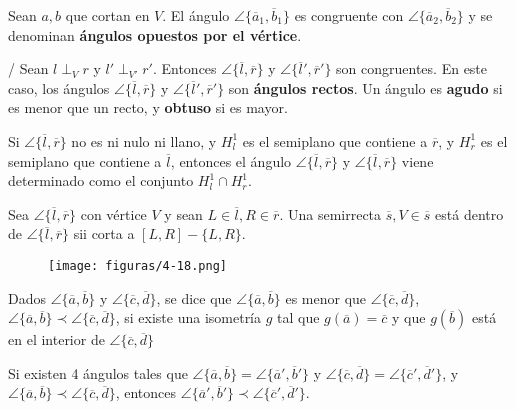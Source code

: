  Sean $a,b$ que cortan en $V$. El ángulo  $\angle \{\overline{a}_1, \overline{b}_1 \}$ es congruente con  $\angle \{\overline{a}_2, \overline{b}_2 \}$ y se denominan \textbf{ángulos opuestos por el vértice}.

/ Sean $l\perp_V r$ y $l'\perp_{V'}r'$. Entonces  $\angle \{\overline{l}, \overline{r} \}$
y $\angle \{\overline{l}', \overline{r}' \}$ son congruentes. En este caso, los ángulos $\angle \{\overline{l}, \overline{r} \}$
y $\angle \{\overline{l}', \overline{r}' \}$ son \textbf{ángulos rectos}.  Un ángulo es \textbf{agudo} si es menor que un recto, y \textbf{obtuso} si es mayor.
	
 Si $\angle \{\overline{l}, \overline{r} \}$ no es ni nulo ni llano, y $H_l^1$ es el semiplano que contiene a $\overline{r}$, y $H^1_r$ es el semiplano que contiene a $\overline{l}$, entonces el ángulo $\angle \{\overline{l}, \overline{r} \}$
y $\angle \{\overline{l}, \overline{r} \}$ viene determinado como el conjunto $H^1_l \cap H^1_r$.


 Sea   $\angle \{\overline{l}, \overline{r} \}$ con vértice $V$ y sean $L \in \overline{l}, R \in \overline{r}$. Una semirrecta $\overline{s}, V \in \overline{s}$ está dentro de  $\angle \{\overline{l}, \overline{r} \}$ sii corta a $[L,R] - \{L,R\}$.

\begin{figure}[H]
	\centering
	\texttt{[image: figuras/4-18.png]}
	\vspace{-1em}
\end{figure}

 Dados   $\angle \{\overline{a}, \overline{b} \}$ y  $\angle \{\overline{c}, \overline{d} \}$, se dice que $\angle \{\overline{a}, \overline{b} \}$ es menor que $\angle \{\overline{c}, \overline{d} \}$, $\angle \{\overline{a}, \overline{b} \} \prec \angle \{\overline{c}, \overline{d} \}$, si existe una isometría $g$ tal que $g(\overline{a}) = \overline{c}$ y que $g(\overline{b})$ está en el interior de  $\angle \{\overline{c}, \overline{d} \}$

 Si existen 4 ángulos tales que
 $\angle\{\overline{a}, \overline{b} \} = \angle\{\overline{a}', \overline{b}' \}$ y $\angle\{\overline{c}, \overline{d} \} = \angle\{\overline{c}', \overline{d}' \}$,  y $\angle\{\overline{a}, \overline{b} \} \prec \angle \{\overline{c}, \overline{d} \}$, entonces
$\angle\{\overline{a}', \overline{b}' \} \prec \angle \{\overline{c}', \overline{d}' \}$.

